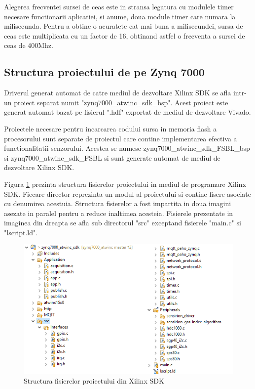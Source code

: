 Alegerea frecventei sursei de ceas este in stransa legatura cu modulele timer necesare functionarii aplicatiei, si anume, doua module timer care numara la milisecunda. 
Pentru a obtine o acuratete cat mai buna a milisecundei, sursa de ceas este multiplicata cu un factor de 16, obtinand astfel o frecventa a sursei de ceas de 400Mhz.

\subsection{Structura proiectului de pe Zynq 7000}\label{subsec:pi_senzor_structurasdk}
Driverul generat automat de catre mediul de dezvoltare Xilinx SDK se afla intr-un proiect separat numit "zynq7000\_atwinc\_sdk\_bsp". Acest proiect este generat automat 
bazat pe fisierul ".hdf" exportat de mediul de dezvoltare Vivado.

Proiectele necesare pentru incarcarea codului sursa in memoria flash a procesorului sunt separate de proiectul care contine implementarea efectiva a functionalitatii 
senzorului. Acestea se numesc zynq7000\_atwinc\_sdk\_FSBL\_bsp si zynq7000\_atwinc\_sdk\_FSBL si sunt generate automat de mediul de dezvoltare Xilinx SDK. 

Figura \ref{fig:PI_SDKFileStructure} prezinta structura fisierelor proiectului in mediul de programare Xilinx SDK. Fiecare director reprezinta un modul al proiectului 
si contine fisere asociate cu denumirea acestuia. Structura fisierelor a fost impartita in doua imagini asezate in paralel pentru a reduce inaltimea acesteia. Fisierele 
prezentate in imaginea din dreapta se afla sub directorul "src" exceptand fisierele "main.c" si "lscript.ld".
\begin{figure}[H]
    \centering
    \includegraphics[scale=0.60]{figs/PI_SDKFileStructure.png}
    \caption{Structura fisierelor proiectului din Xilinx SDK}
    \label{fig:PI_SDKFileStructure}
\end{figure}

